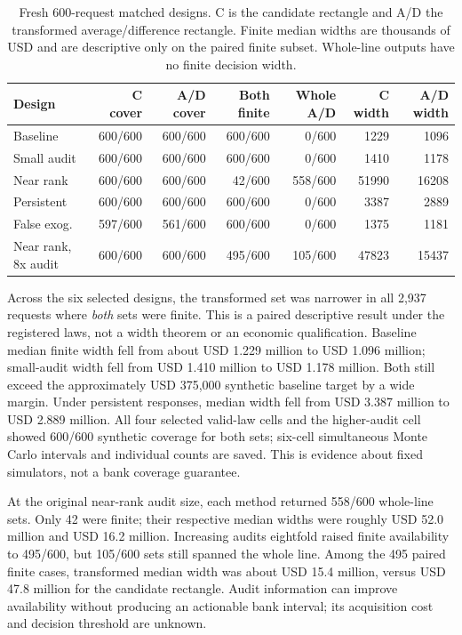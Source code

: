 \begin{table}[htbp]
\centering\small
\caption{Fresh 600-request matched designs. C is the candidate rectangle and A/D the transformed average/difference rectangle. Finite median widths are thousands of USD and are descriptive only on the paired finite subset. Whole-line outputs have no finite decision width.}
\label{integrated:weak_audit_sharpening:tab:sharpening}
\begin{tabular}{lrrrrrr}
\toprule
Design & C cover & A/D cover & Both finite & Whole A/D & C width & A/D width \\
\midrule
Baseline & 600/600 & 600/600 & 600/600 & 0/600 & 1229 & 1096 \\
Small audit & 600/600 & 600/600 & 600/600 & 0/600 & 1410 & 1178 \\
Near rank & 600/600 & 600/600 & 42/600 & 558/600 & 51990 & 16208 \\
Persistent & 600/600 & 600/600 & 600/600 & 0/600 & 3387 & 2889 \\
False exog. & 597/600 & 561/600 & 600/600 & 0/600 & 1375 & 1181 \\
Near rank, 8x audit & 600/600 & 600/600 & 495/600 & 105/600 & 47823 & 15437 \\
\bottomrule
\end{tabular}
\end{table}


Across the six selected designs, the transformed set was narrower in all
2,937 requests where \emph{both} sets were finite. This is a paired descriptive
result under the registered laws, not a width theorem or an economic
qualification. Baseline median finite width fell from about USD 1.229 million
to USD 1.096 million; small-audit width fell from USD 1.410 million to
USD 1.178 million. Both still exceed the approximately USD 375,000 synthetic
baseline target by a wide margin. Under persistent responses, median width
fell from USD 3.387 million to USD 2.889 million. All four selected valid-law
cells and the higher-audit cell showed 600/600 synthetic coverage for both
sets; six-cell simultaneous Monte Carlo intervals and individual counts are
saved. This is evidence about fixed simulators, not a bank coverage guarantee.

At the original near-rank audit size, each method returned 558/600 whole-line
sets. Only 42 were finite; their respective median widths were roughly
USD 52.0 million and USD 16.2 million. Increasing audits eightfold raised
finite availability to 495/600, but 105/600 sets still spanned the whole line.
Among the 495 paired finite cases, transformed median width was about
USD 15.4 million, versus USD 47.8 million for the candidate rectangle. Audit
information can improve availability without producing an actionable bank
interval; its acquisition cost and decision threshold are unknown.

